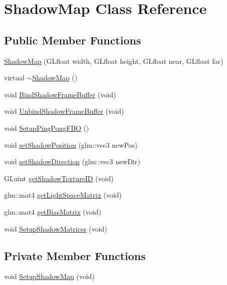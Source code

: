 \hypertarget{class_shadow_map}{}\section{Shadow\+Map Class Reference}
\label{class_shadow_map}
\subsection*{Public Member Functions}
\begin{DoxyCompactItemize}
\item 
\hyperlink{class_shadow_map_aad205032db3d7d854ba714acf111eec2}{Shadow\+Map} (G\+Lfloat width, G\+Lfloat height, G\+Lfloat near, G\+Lfloat far)
\item 
virtual \hyperlink{class_shadow_map_a90af55a8b823d1863ba2e76a50de8f38}{$\sim$\+Shadow\+Map} ()
\item 
void \hyperlink{class_shadow_map_aea0e3d6a4b32b256b3318ea94d7cda9e}{Bind\+Shadow\+Frame\+Buffer} (void)
\item 
void \hyperlink{class_shadow_map_a0b8328ce476f157f00c78f905706be73}{Unbind\+Shadow\+Frame\+Buffer} (void)
\item 
void \hyperlink{class_shadow_map_a7ee7e51d8d5fb048b19acaaccae3c1d4}{Setup\+Ping\+Pong\+F\+BO} ()
\item 
void \hyperlink{class_shadow_map_adce20a1694daa11845bb8a4cabfe3f18}{set\+Shadow\+Position} (glm\+::vec3 new\+Pos)
\item 
void \hyperlink{class_shadow_map_a4c28748161d18d8e260ef21bc402af9d}{set\+Shadow\+Direction} (glm\+::vec3 new\+Dir)
\item 
G\+Luint \hyperlink{class_shadow_map_a4ecae9c8ba5f3e1eb1fa0899615d9f96}{get\+Shadow\+Texture\+ID} (void)
\item 
glm\+::mat4 \hyperlink{class_shadow_map_a860d36ab2c85037db4005258ed17f8a0}{get\+Light\+Space\+Matrix} (void)
\item 
glm\+::mat4 \hyperlink{class_shadow_map_a06668973dbcad477693f1a80879e24b1}{get\+Bias\+Matrix} (void)
\item 
void \hyperlink{class_shadow_map_acce822bf94608533989b77998eea48b6}{Setup\+Shadow\+Matrices} (void)
\end{DoxyCompactItemize}
\subsection*{Private Member Functions}
\begin{DoxyCompactItemize}
\item 
void \hyperlink{class_shadow_map_a4d4aa3ef5716aeeaee64d8431e432947}{Setup\+Shadow\+Map} (void)
\end{DoxyCompactItemize}
